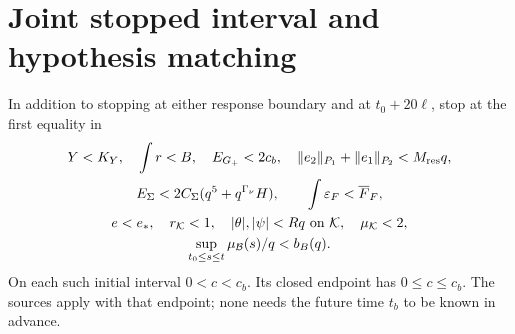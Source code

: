 \documentclass[11pt]{article}
\theoremstyle{remark}\newtheorem{remark}[theorem]{Remark}
\newcommand{\KK}{\mathcal K}
\newcommand{\BB}{\mathcal B}
\newcommand{\Gp}{G_+}
\newcommand{\eps}{\varepsilon}
\begin{document}
\section{Joint stopped interval and hypothesis matching}
In addition to stopping at either response boundary and at
$t_0+20\ell$, stop at the first equality in
\begin{equation}
 \begin{gathered}
 Y<K_Y,\quad\int r<B,\quad E_{\Gp}<2c_b,\quad
 \|e_2\|_{P_1}+\|e_1\|_{P_2}<M_{\rm res}q,\\
 E_\Sigma<2C_\Sigma(q^5+q^{\Gamma_\nu}H),\qquad
 \int\eps_F<\overline F_F,\\
 e<e_*,\quad r_{\KK}<1,\quad
 |\theta|,|\psi|<Rq\text{ on }\KK,\quad\mu_{\KK}<2,\\
 \sup_{t_0\le s\le t}\mu_{\BB}(s)/q<b_B(q).
 \end{gathered}
 \label{an03wptv1:guards}
\end{equation}
On each such initial interval $0<c<c_b$. Its closed endpoint
has $0\le c\le c_b$. The sources apply with that endpoint;
none needs the future time $t_b$ to be known in advance.
\end{document}
